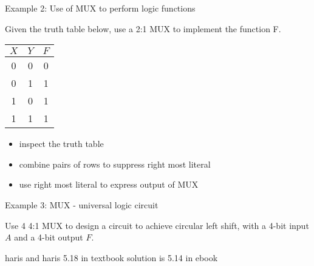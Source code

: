 \begin{frame}{Example 2: Use of MUX to perform logic functions}
    \begin{tcolorbox}[enhanced,attach boxed title to top center={yshift=-3mm,yshifttext=-1mm},
  colback=blue!5!white,colframe=blue!75!black,colbacktitle=blue!80!black,
  title=Think About It,fonttitle=\bfseries,
  boxed title style={size=small,colframe=red!50!black} ]
  Given the truth table below, use a 2:1 MUX to implement the function F.
 \begin{center}
		\begin{tabular}{cc|c}
		$X$ & $Y$ & $F$\\\hline
		0 & 0 & 0\\
		0 & 1 & 1\\
		1 & 0 & 1\\
		1 & 1 & 1\\
		\end{tabular}
		\end{center}
  \begin{itemize}
    \item inspect the truth table 
    \item combine pairs of rows to suppress right most literal
    \item use right most literal to express output of MUX 
  \end{itemize}
\end{tcolorbox}
\end{frame}

\begin{frame}{Example 3: MUX - universal logic circuit}
    \begin{tcolorbox}[enhanced,attach boxed title to top center={yshift=-3mm,yshifttext=-1mm},
  colback=blue!5!white,colframe=blue!75!black,colbacktitle=blue!80!black,
  title=Think About It,fonttitle=\bfseries,
  boxed title style={size=small,colframe=red!50!black} ]
  Use 4 4:1 MUX to design a circuit to achieve circular left shift, with a 4-bit input $A$ and a 4-bit output $F$.
\end{tcolorbox}

\BNotes\ifnum{}
haris and haris 5.18 in textbook solution is 5.14 in ebook
\fi
\end{frame}


